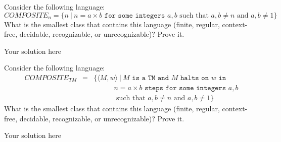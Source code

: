 \documentclass[12pt]{article}
\newenvironment{exercise}[2][Exercise]{\begin{trivlist}
\item[\hskip \labelsep {\bfseries #1}\hskip \labelsep {\bfseries #2.}]}{\end{trivlist}}
\newenvironment{solution}[1][{\color{red} Solution:}]{\begin{trivlist}
\item[\hskip \labelsep {\bfseries #1}\hskip \labelsep {\bfseries}]}{\end{trivlist}}
\begin{document}
 


\newcommand{\studentName}{YOUR NAME HERE} %

\newcommand{\collaborators}{
	with \textit{COLLABORATORS' NAMES HERE}
}

\begin{exercise}{1}
Consider the following language:
\[COMPOSITE_n = \{n \ | \ n = a\times b \texttt{ for some integers } a,b \text{ such that } a, b \neq n \text{ and } a, b \neq 1  \}\]
What is the smallest class that contains this language (finite, regular, context-free, decidable, recognizable, or unrecognizable)? Prove it.
\end{exercise}

\begin{solution}
Your solution here
\end{solution}

\clearpage

\begin{exercise}{2}
Consider the following language:
\begin{eqnarray*}
COMPOSITE_{TM} & = & \{\langle M,w \rangle \ | \ M \texttt{ is a TM and } M \texttt{ halts on } w \texttt{ in }\\
&& \ \ \ \ \ \ \ \ \ \ \ \ \ n = a\times b \texttt{ steps for some integers } a,b\\
&& \ \ \ \ \ \ \ \ \ \ \ \ \ \text{ such that } a, b \neq n \text{ and } a, b \neq 1\}
\end{eqnarray*}
What is the smallest class that contains this language (finite, regular, context-free, decidable, recognizable, or unrecognizable)? Prove it.
\end{exercise}

\begin{solution}
Your solution here
\end{solution}
\end{document}

